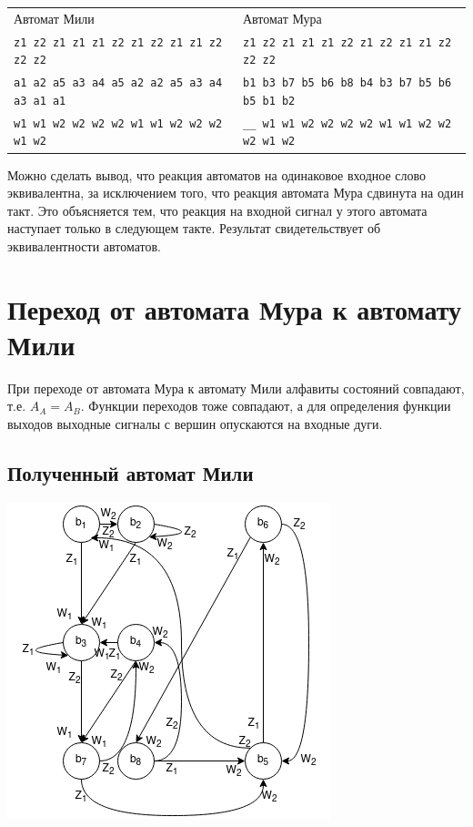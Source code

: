 \documentclass[12pt, a4paper]{article}
\begin{document}
\noindent
\begin{small}
\begin{tabular}{ l | l }
  \normalsize{Автомат Мили} & \normalsize{Автомат Мура} \\
  \texttt{z1 z2 z1 z1 z1 z2 z1 z2 z1 z1 z2 z2 z2} & 
    \texttt{z1 z2 z1 z1 z1 z2 z1 z2 z1 z1 z2 z2 z2} \\
  \texttt{a1 a2 a5 a3 a4 a5 a2 a2 a5 a3 a4 a3 a1 a1} &
    \texttt{b1 b3 b7 b5 b6 b8 b4 b3 b7 b5 b6 b5 b1 b2} \\
  \texttt{w1 w1 w2 w2 w2 w2 w1 w1 w2 w2 w2 w1 w2} &
    \texttt{\_\_ w1 w1 w2 w2 w2 w2 w1 w1 w2 w2 w2 w1 w2}
\end{tabular}
\end{small}

Можно сделать вывод, что реакция автоматов на одинаковое входное слово
эквивалентна, за исключением того, что реакция автомата Мура сдвинута на один
такт. Это объясняется тем, что реакция на входной сигнал у этого автомата
наступает только в следующем такте. Результат свидетельствует об эквивалентности
автоматов.

\section*{Переход от автомата Мура к автомату Мили}

При переходе от автомата Мура к автомату Мили алфавиты состояний совпадают,
т.е. $A_A = A_B$. Функции переходов тоже совпадают, а для определения функции
выходов выходные сигналы с вершин опускаются на входные дуги.

\subsection*{Полученный автомат Мили}

\begin{center}
\includegraphics[scale=0.8]{mili}\\
\end{center}
\end{document}

